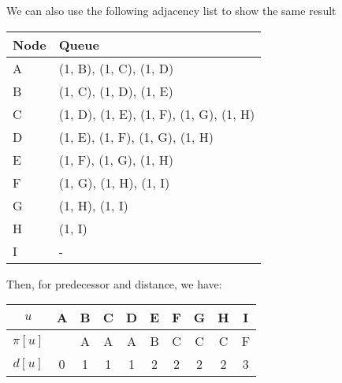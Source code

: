 \begin{eg}
    We can also use the following adjacency list to show the same result
    \begin{table}[H]
      \centering
      \begin{tabular}{l|l}
          Node & Queue  \\
        \midrule
          A & (1, B), (1, C), (1, D) \\
          B & (1, C), (1, D), (1, E) \\
          C & (1, D), (1, E), (1, F), (1, G), (1, H) \\
          D & (1, E), (1, F), (1, G), (1, H) \\
          E & (1, F), (1, G), (1, H) \\
          F & (1, G), (1, H), (1, I) \\
          G & (1, H), (1, I) \\
          H & (1, I) \\
          I & -
      \end{tabular}
    \end{table}
  Then, for predecessor and distance, we have:
  \begin{table}[H]
    \centering
    \begin{tabular}{c|c|c|c|c|c|c|c|c|c}
      \(u\)  & A & B & C & D & E & F & G & H & I  \\
      \midrule
      \(\pi[u]\) &   & A & A & A & B & C & C & C & F \\
      \midrule
      \(d[u]\) & 0 & 1 & 1 & 1 & 2 & 2 & 2 & 2 & 3 \\
    \end{tabular}
  \end{table}
\end{eg}

\newpage
